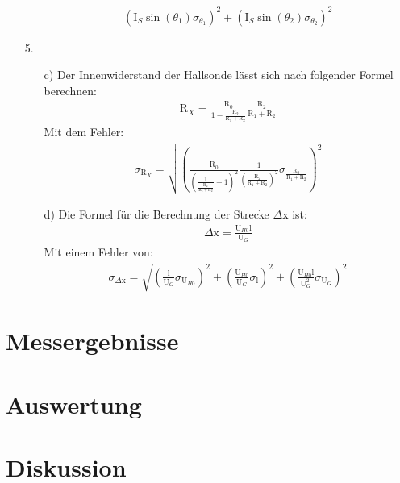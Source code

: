 \documentclass[12pt]{scrartcl}
\begin{document}
\begin{enumerate}
\begin{enumerate}
\begin{align}
{\left(\text{I}_S \sin(\theta_1) \sigma_{\theta_1}\right)^2+
\left(\text{I}_S \sin(\theta_2) \sigma_{\theta_2}\right)^2}
\end{align}
\end{enumerate}
\item[5.]
\begin{enumerate}
\item[c)] Der Innenwiderstand der Hallsonde lässt sich nach folgender Formel berechnen:
\begin{align}
\text{R}_X = \frac{\text{R}_0}{1-\frac{\text{R}_2}{\text{R}_1+\text{R}_2}}\frac{\text{R}_2}{\text{R}_1+\text{R}_2}
\end{align}
Mit dem Fehler:
\begin{align}
\sigma_{\text{R}_X} = \sqrt{\left(\frac{\text{R}_0}{\left(\frac{1}{\frac{\text{R}_2}{\text{R}_1+\text{R}_2}}-1\right)^2}\frac{1}{\left(\frac{\text{R}_2}{\text{R}_1+
\text{R}_2}\right)^2}\sigma_{\frac{\text{R}_2}{\text{R}_1+\text{R}_2}}\right)^2}
\end{align}

\item[d)]
Die Formel für die Berechnung der Strecke $\Delta$x ist:
\begin{align}
\Delta \text{x} = \frac{\text{U}_{H0}\text{l}}{\text{U}_G}
\end{align}
Mit einem Fehler von:
\begin{align}
\sigma_{\Delta \text{x}} = \sqrt{
\left(\frac{\text{l}}{\text{U}_G}\sigma_{\text{U}_{H0}}\right)^2+
\left(\frac{\text{U}_{H0}}{\text{U}_G}\sigma_{\text{l}}\right)^2+
\left(\frac{\text{U}_{H0}\text{l}}{\text{U}_G^2}\sigma_{\text{U}_G}\right)^2}
\end{align}
\end{enumerate}

\end{enumerate}

\section{Messergebnisse}



\section{Auswertung}


\section{Diskussion}


\end{document}
